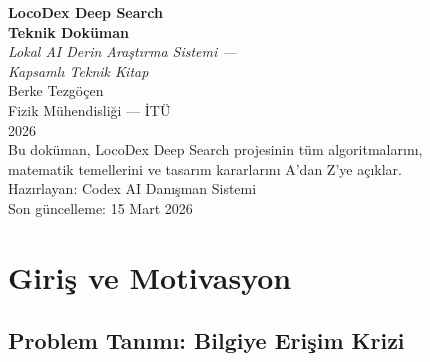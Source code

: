 \documentclass[12pt,a4paper,oneside]{book}
\theoremstyle{definition}
\begin{document}
\begin{titlepage}
\centering
\vspace*{4cm}

{\Huge\bfseries\color{chapterBlue} LocoDex Deep Search}\\[0.8cm]
{\Huge\bfseries\color{chapterBlue} Teknik Dok\"{u}man}\\[1.5cm]

{\Large\itshape\color{sectionBlue} Lokal AI Derin Ara\c{s}t{\i}rma Sistemi ---\\[0.3cm]
Kapsaml{\i} Teknik Kitap}\\[2cm]

{\Large\color{textWhite} Berke Tezg\"{o}\c{c}en}\\[0.3cm]
{\large\color{sectionBlue!70} Fizik M\"{u}hendisli\u{g}i --- \.{I}T\"{U}}\\[0.3cm]
{\large\color{sectionBlue!70} 2026}\\[3cm]

{\normalsize\color{sectionBlue!50}
Bu dok\"{u}man, LocoDex Deep Search projesinin t\"{u}m algoritmalar{\i}n{\i},\\
matematik temellerini ve tasar{\i}m kararlar{\i}n{\i} A'dan Z'ye a\c{c}{\i}klar.}\\[3cm]

{\small\color{sectionBlue!40} Haz{\i}rlayan: Codex AI Dan{\i}\c{s}man Sistemi\\
Son g\"{u}ncelleme: 15 Mart 2026}
\end{titlepage}

\tableofcontents
\newpage

\chapter{Giri\c{s} ve Motivasyon}
\label{chap:giris}

\section{Problem Tan{\i}m{\i}: Bilgiye Eri\c{s}im Krizi}
\label{sec:problem}
\end{document}
